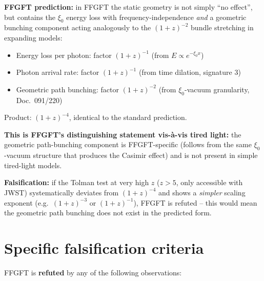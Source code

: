 \textbf{FFGFT prediction:} in FFGFT the static geometry is not simply
\enquote{no effect}, but contains the $\xi_0$ energy loss with
frequency-independence \emph{and} a geometric bunching component
acting analogously to the $(1+z)^{-2}$ bundle stretching in expanding
models:
\begin{itemize}[leftmargin=2em,itemsep=2pt,topsep=2pt]
  \item Energy loss per photon: factor $(1+z)^{-1}$ (from $E \propto e^{-\xi_0 x}$)
  \item Photon arrival rate: factor $(1+z)^{-1}$ (from time dilation, signature 3)
  \item Geometric path bunching: factor $(1+z)^{-2}$ (from
        $\xi_0$-vacuum granularity, Doc.~091/220)
\end{itemize}
Product: $(1+z)^{-4}$, identical to the standard prediction.

\textbf{This is FFGFT's distinguishing statement vis-à-vis tired
light:} the geometric path-bunching component is FFGFT-specific
(follows from the same $\xi_0$-vacuum structure that produces the
Casimir effect) and is not present in simple tired-light models.

\textbf{Falsification:} if the Tolman test at very high $z$
($z > 5$, only accessible with JWST) systematically deviates from
$(1+z)^{-4}$ and shows a \emph{simpler} scaling exponent (e.g.\
$(1+z)^{-3}$ or $(1+z)^{-1}$), FFGFT is refuted -- this would mean
the geometric path bunching does not exist in the predicted form.

\section{Specific falsification criteria}

FFGFT is \textbf{refuted} by any of the following observations:

